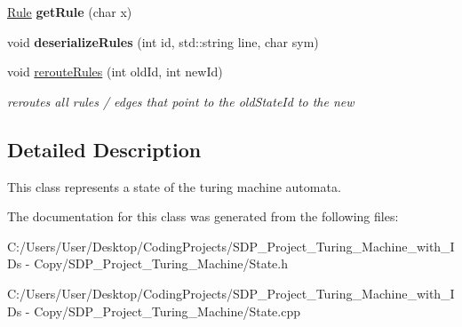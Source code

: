 \begin{DoxyCompactItemize}
\item 
\mbox{\label{class_state_aa0f2ef05f5cc5c34816138748a456d3c}} 
\mbox{\hyperlink{class_rule}{Rule}} {\bfseries get\+Rule} (char x)
\item 
\mbox{\label{class_state_a8fd4cc3e095b2adbe58f2c0707ad3069}} 
void {\bfseries deserialize\+Rules} (int id, std\+::string line, char sym)
\item 
\mbox{\label{class_state_aa224eaf7bfd9a6c542ebab9116b0e258}} 
void \mbox{\hyperlink{class_state_aa224eaf7bfd9a6c542ebab9116b0e258}{reroute\+Rules}} (int old\+Id, int new\+Id)
\begin{DoxyCompactList}\small\item\em reroutes all rules / edges that point to the old\+State\+Id to the new \end{DoxyCompactList}\end{DoxyCompactItemize}


\subsection{Detailed Description}
This class represents a state of the turing machine automata. 

The documentation for this class was generated from the following files\+:\begin{DoxyCompactItemize}
\item 
C\+:/\+Users/\+User/\+Desktop/\+Coding\+Projects/\+S\+D\+P\+\_\+\+Project\+\_\+\+Turing\+\_\+\+Machine\+\_\+with\+\_\+\+I\+Ds -\/ Copy/\+S\+D\+P\+\_\+\+Project\+\_\+\+Turing\+\_\+\+Machine/State.\+h\item 
C\+:/\+Users/\+User/\+Desktop/\+Coding\+Projects/\+S\+D\+P\+\_\+\+Project\+\_\+\+Turing\+\_\+\+Machine\+\_\+with\+\_\+\+I\+Ds -\/ Copy/\+S\+D\+P\+\_\+\+Project\+\_\+\+Turing\+\_\+\+Machine/State.\+cpp\end{DoxyCompactItemize}

